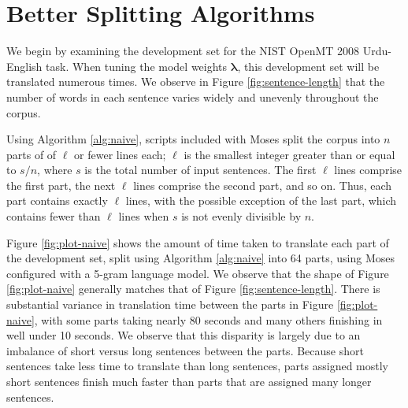 \documentclass{pbml}
\begin{document}
\section{Better Splitting Algorithms}
\label{sec:better}

We begin by examining the development set for the NIST OpenMT 2008 Urdu-English task. When tuning the model weights $\bm{\lambda}$, this development set will be translated numerous times. We observe in Figure \ref{fig:sentence-length} that the number of words in each sentence varies widely and unevenly throughout the corpus. %

Using Algorithm \ref{alg:naive}, scripts included with Moses \citep{moses} split the corpus into $n$ parts of of $\ell$ or fewer lines each; $\ell$ is the smallest integer greater than or equal to $s/n$, where $s$ is the total number of input sentences. The first $\ell$ lines comprise the first part, the next $\ell$ lines comprise the second part, and so on. Thus, each part contains exactly $\ell$ lines, with the possible exception of the last part, which contains fewer than $\ell$ lines when $s$ is not evenly divisible by $n$.

Figure \ref{fig:plot-naive} shows the amount of time taken to translate each part of the development set, split using Algorithm \ref{alg:naive} into 64 parts, using Moses configured with a 5-gram language model. 
We observe that the shape of Figure \ref{fig:plot-naive} generally matches that of Figure \ref{fig:sentence-length}.
There is substantial variance in translation time between the parts in Figure \ref{fig:plot-naive}, with some parts taking nearly 80 seconds and many others finishing in well under 10 seconds. We observe that this disparity is largely due to an imbalance of short versus long sentences between the parts. Because short sentences take less time to translate than long sentences, parts assigned mostly short sentences finish much faster than parts that are assigned many longer sentences. 
\end{document}
